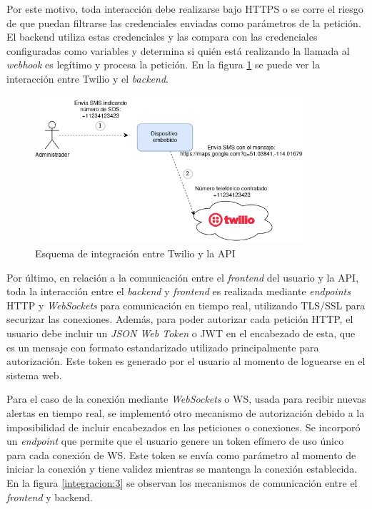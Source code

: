 Por este motivo, toda interacción debe realizarse bajo HTTPS o se corre el riesgo de que puedan filtrarse las credenciales enviadas como parámetros de la petición. El backend utiliza estas credenciales y las compara con las credenciales configuradas como variables y determina si quién está realizando la llamada al \textit{webhook} es legítimo y procesa la petición. En la figura \ref{integracion:2} se puede ver la interacción entre Twilio y el \textit{backend}.

\begin{figure}[H]
	\centering
	\includegraphics[width=0.9\textwidth]{./Figures/integracion-1.png}
	\caption{Esquema de integración entre Twilio y la API}
	\label{integracion:2}
\end{figure}


Por último, en relación a la comunicación entre el \textit{frontend} del usuario y la API, toda la interacción entre el \textit{backend} y \textit{frontend} es realizada mediante \textit{endpoints} HTTP y \textit{WebSockets} para comunicación en tiempo real, utilizando TLS/SSL para securizar las conexiones. Además, para poder autorizar cada petición HTTP, el usuario debe incluir un \textit{JSON Web Token} o JWT en el encabezado de esta, que es un mensaje con formato estandarizado utilizado principalmente para autorización\citep{JWT:1}. Este token es generado por el usuario al momento de loguearse en el sistema web.

Para el caso de la conexión mediante \textit{WebSockets} o WS, usada para recibir nuevas alertas en tiempo real, se implementó otro mecanismo de autorización debido a la imposibilidad de incluir encabezados en las peticiones o conexiones. Se incorporó un \textit{endpoint} que permite que el usuario genere un token efímero de uso único para cada conexión de WS. Este token se envía como parámetro al momento de iniciar la conexión y tiene validez mientras se mantenga la conexión establecida. En la figura \ref{integracion:3} se observan los mecanismos de comunicación entre el \textit{frontend} y backend.

